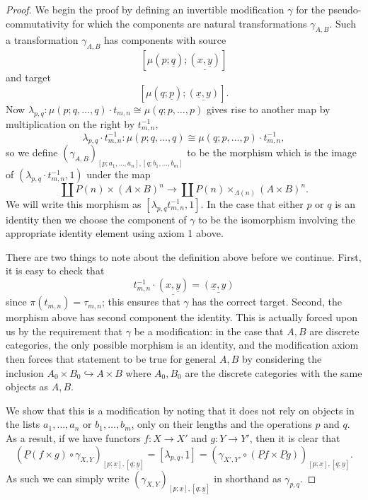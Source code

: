 \documentclass{amsbook} %
\numberwithin{section}{chapter}
\begin{document}
\begin{proof}
We begin the proof by defining an invertible modification $\gamma$ for the pseudo-commutativity for which the components are natural transformations $\gamma_{A,B}$.  Such a transformation $\gamma_{A,B}$ has components with source
  \[
    \left[\mu\left(p; \underline{q}\right); \underline{(x, \underline{y})}\right]
  \]
and target
  \[
    \left[\mu\left(q; \underline{p}\right); \underline{(\underline{x},y)}\right].
  \]
Now $ \lambda_{p,q} \colon \mu(p;q,\ldots,q) \cdot t_{m,n} \cong \mu(q;p,\ldots,p)$ gives rise to another map by multiplication on the right by $t_{m,n}^{-1}$,
  \[
    \lambda_{p,q}\cdot t_{m,n}^{-1} \colon \mu(p;q,\ldots,q) \cong \mu(q;p,\ldots,p) \cdot t_{m,n}^{-1},
  \]
so we define $(\gamma_{A,B})_{[p;a_1,\ldots,a_n],[q;b_1,\ldots,b_m]}$ to be the morphism which is the image of $(\lambda_{p,q}\cdot t_{m,n}^{-1}, 1)$ under the map
  \[
    \coprod P(n) \times (A \times B)^{n} \rightarrow \coprod P(n) \times_{\Lambda(n)} (A \times B)^{n}.
  \]
We will write this morphism as $[\lambda_{p,q}t_{m,n}^{-1}, 1]$.  In the case that either $p$ or $q$ is an identity then we choose the component of $\gamma$ to be the isomorphism involving the appropriate identity element using axiom 1 above.

There are two things to note about the definition above before we continue.  First, it is easy to check that
  \[
    t_{m,n}^{-1} \cdot \underline{\left(x, \underline{y}\right)} = \underline{\left(\underline{x},y\right)}
  \]
since $\pi(t_{m,n}) = \tau_{m,n}$; this ensures that $\gamma$ has the correct target.  Second, the morphism above has second component the identity.  This is actually forced upon us by the requirement that $\gamma$ be a modification:  in the case that $A,B$ are discrete categories, the only possible morphism is an identity, and the modification axiom then forces that statement to be true for general $A,B$ by considering the inclusion $A_{0} \times B_{0} \hookrightarrow A \times B$ where $A_{0}, B_{0}$ are the discrete categories with the same objects as $A, B$.

We show that this is a modification by noting that it does not rely on objects in the lists $a_1, \ldots, a_n$ or $b_1, \ldots, b_m$, only on their lengths and the operations $p$ and $q$. As a result, if we have functors $f \colon X \rightarrow X'$ and $g \colon Y \rightarrow Y'$, then it is clear that
    \[
        (\underline{P}(f\times g) \circ \gamma_{X,Y})_{\left[p;\underline{x}\right],\left[q;\underline{y}\right]} = [\lambda_{p,q},\underline{1}] = (\gamma_{X',Y'} \circ (\underline{P}f\times \underline{P}g))_{\left[p;\underline{x}\right],\left[q;\underline{y}\right]}.
    \]
As such we can simply write $(\gamma_{X,Y})_{[p;\underline{x}],[q;\underline{y}]}$ in shorthand as $\gamma_{p,q}$.


\end{proof}
\end{document}

